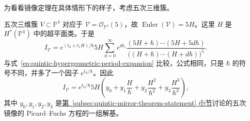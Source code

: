 为看看镜像定理在具体情形下的样子，考虑五次三维簇。
\begin{example}\leavevmode{}\label{ex:givental-quintic-mirror-potential}%
五次三维簇 $V\subset\mathbb P^4$ 对应于 $\mathcal V=\mathcal O_{\mathbb P^4}(5)$，故 $\operatorname{Euler}(\mathcal V)=5H$。这里 $H$ 是 $H^*(\mathbb P^4)$ 中的超平面类。于是
\[
I_{\mathcal V}=e^{(t_0+t_1H)/\hbar}5H\sum_{d=0}^{\infty}e^{dt_1}
\frac{(5H+\hbar)\cdots(5H+5d\hbar)}
{\bigl((H+\hbar)\cdots(H+d\hbar)\bigr)^5}.
\]
与式~\eqref{eq:quintic-hypergeometric-period-expansion} 比较，公式相同，只是 $\hbar$ 的符号不同，并多了一个因子 $e^{t_0/\hbar}$。因此
\[
I_{\mathcal V}=e^{t_0/\hbar}5H
\left(y_0+y_1\frac H\hbar+y_2\frac{H^2}{\hbar^2}+y_3\frac{H^3}{\hbar^3}\right),
\]
其中 $y_0,y_1,y_2,y_3$ 是\hyperref[subsec:quintic-mirror-theorem-statement]{第~\ref*{subsec:quintic-mirror-theorem-statement} 小节}讨论的五次镜像的 Picard--Fuchs 方程的一组解基。


\end{example}
